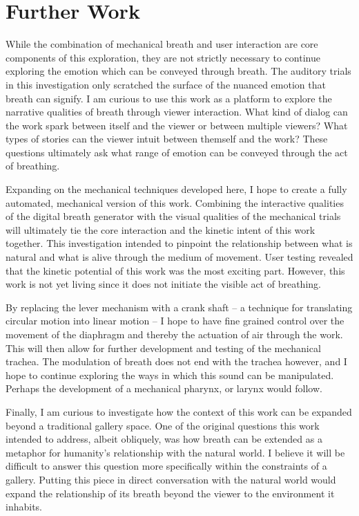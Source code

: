 \documentclass[letterpaper]{article}
\begin{document}
\section{Further Work}



While the combination of mechanical breath and user interaction are core components of this exploration, they are not strictly necessary to continue exploring the emotion which can be conveyed through breath. The auditory trials in this investigation only scratched the surface of the nuanced emotion that breath can signify. I am curious to use this work as a platform to explore the narrative qualities of breath through viewer interaction. What kind of dialog can the work spark between itself and the viewer or between multiple viewers? What types of stories can the viewer intuit between themself and the work? These questions ultimately ask what range of emotion can be conveyed through the act of breathing.

Expanding on the mechanical techniques developed here, I hope to create a fully automated, mechanical version of this work. Combining the interactive qualities of the digital breath generator with the visual qualities of the mechanical trials will ultimately tie the core interaction and the kinetic intent of this work together. This investigation intended to pinpoint the relationship between what is natural and what is alive through the medium of movement. User testing revealed that the kinetic potential of this work was the most exciting part. However, this work is not yet living since it does not initiate the visible act of breathing.

By replacing the lever mechanism with a crank shaft -- a technique for translating circular motion into linear motion -- I hope to have fine grained control over the movement of the diaphragm and thereby the actuation of air through the work. This will then allow for further development and testing of the mechanical trachea. The modulation of breath does not end with the trachea however, and I hope to continue exploring the ways in which this sound can be manipulated. Perhaps the development of a mechanical pharynx, or larynx would follow. 

Finally, I am curious to investigate how the context of this work can be expanded beyond a traditional gallery space. One of the original questions this work intended to address, albeit obliquely, was how breath can be extended as a metaphor for humanity's relationship with the natural world. I believe it will be difficult to answer this question more specifically within the constraints of a gallery. Putting this piece in direct conversation with the natural world would expand the relationship of its breath beyond the viewer to the environment it inhabits. 
\end{document}

